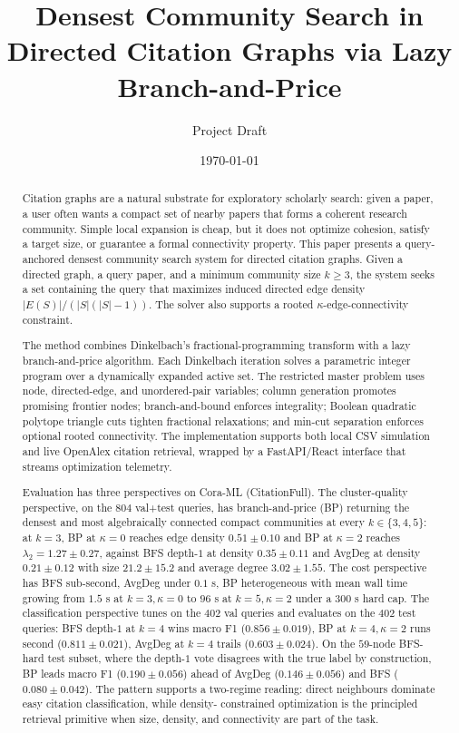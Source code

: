 \documentclass[11pt]{article}
\title{Densest Community Search in Directed Citation Graphs via Lazy Branch-and-Price}
\author{Project Draft}
\date{\today}
\begin{document}
\maketitle

\begin{abstract}
Citation graphs are a natural substrate for exploratory scholarly search:
given a paper, a user often wants a compact set of nearby papers that
forms a coherent research community. Simple local expansion is cheap, but
it does not optimize cohesion, satisfy a target size, or guarantee a
formal connectivity property. This paper presents a query-anchored
densest community search system for directed citation graphs. Given a
directed graph, a query paper, and a minimum community size $k \ge 3$,
the system seeks a set containing the query that maximizes induced
directed edge density $|E(S)| / (|S|(|S|-1))$. The solver also supports
a rooted $\kappa$-edge-connectivity constraint.

The method combines Dinkelbach's fractional-programming transform with a
lazy branch-and-price algorithm. Each Dinkelbach iteration solves a
parametric integer program over a dynamically expanded active set. The
restricted master problem uses node, directed-edge, and unordered-pair
variables; column generation promotes promising frontier nodes;
branch-and-bound enforces integrality; Boolean quadratic polytope
triangle cuts tighten fractional relaxations; and min-cut separation
enforces optional rooted connectivity. The implementation supports both
local CSV simulation and live OpenAlex citation retrieval, wrapped by a
FastAPI/React interface that streams optimization telemetry.

Evaluation has three perspectives on Cora-ML (CitationFull). The
cluster-quality perspective, on the $804$ val+test queries, has
branch-and-price (BP) returning the densest and most algebraically
connected compact communities at every $k \in \{3, 4, 5\}$: at $k = 3$,
BP at $\kappa = 0$ reaches edge density $0.51 \pm 0.10$ and BP at
$\kappa = 2$ reaches $\lambda_2 = 1.27 \pm 0.27$, against BFS depth-$1$
at density $0.35 \pm 0.11$ and AvgDeg at density $0.21 \pm 0.12$ with
size $21.2 \pm 15.2$ and average degree $3.02 \pm 1.55$. The cost
perspective has BFS sub-second, AvgDeg under $0.1$ s, BP heterogeneous
with mean wall time growing from $1.5$ s at $k = 3, \kappa = 0$ to
$96$ s at $k = 5, \kappa = 2$ under a $300$ s hard cap. The
classification perspective tunes on the $402$ val queries and evaluates
on the $402$ test queries: BFS depth-$1$ at $k = 4$ wins macro F1
($0.856 \pm 0.019$), BP at $k = 4, \kappa = 2$ runs second
($0.811 \pm 0.021$), AvgDeg at $k = 4$ trails ($0.603 \pm 0.024$). On
the $59$-node BFS-hard test subset, where the depth-$1$ vote disagrees
with the true label by construction, BP leads macro F1
($0.190 \pm 0.056$) ahead of AvgDeg ($0.146 \pm 0.056$) and BFS
($0.080 \pm 0.042$). The pattern supports a two-regime reading: direct
neighbours dominate easy citation classification, while density-
constrained optimization is the principled retrieval primitive when
size, density, and connectivity are part of the task.
\end{abstract}
\end{document}
